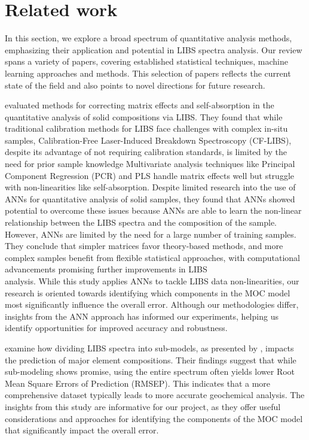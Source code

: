 \section{Related work}\label{sec:related_works}
In this section, we explore a broad spectrum of quantitative analysis methods, emphasizing their application and potential in LIBS spectra analysis. Our review spans a variety of papers, covering established statistical techniques, machine learning approaches and methods. This selection of papers reflects the current state of the field and also points to novel directions for future research.

\citeauthor{takahashi_quantitative_2017} evaluated methods for correcting matrix effects and self-absorption in the quantitative analysis of solid compositions via LIBS.
They found that while traditional calibration methods for LIBS face challenges with complex in-situ samples, Calibration-Free Laser-Induced Breakdown Spectroscopy (CF-LIBS), despite its advantage of not requiring calibration standards, is limited by the need for prior sample knowledge\cite{hu_review_2022}
Multivariate analysis techniques like Principal Component Regression (PCR) and PLS handle matrix effects well but struggle with non-linearities like self-absorption.
Despite limited research into the use of ANNs for quantitative analysis of solid samples, they found that ANNs showed potential to overcome these issues because ANNs are able to learn the non-linear relationship between the LIBS spectra and the composition of the sample.
However, ANNs are limited by the need for a large number of training samples.
They conclude that simpler matrices favor theory-based methods, and more complex samples benefit from flexible statistical approaches, with computational advancements promising further improvements in LIBS \\analysis\cite{takahashi_quantitative_2017}.
While this study applies ANNs to tackle LIBS data non-linearities, our research is oriented towards identifying which components in the MOC model most significantly influence the overall error. Although our methodologies differ, insights from the ANN approach has informed our experiments, helping us identify opportunities for improved accuracy and robustness.

\citeauthor{lepore_quantitative_2022} examine how dividing LIBS spectra into sub-models, as presented by \citet{andersonImprovedAccuracyQuantitative2017}, impacts the prediction of major element compositions.
Their findings suggest that while sub-modeling shows promise, using the entire spectrum often yields lower Root Mean Square Errors of Prediction (RMSEP). 
This indicates that a more comprehensive dataset typically leads to more accurate geochemical analysis\cite{lepore_quantitative_2022}.
The insights from this study are informative for our project, as they offer useful considerations and approaches for identifying the components of the MOC model that significantly impact the overall error.

